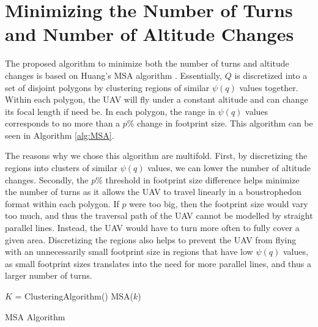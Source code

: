 \documentclass[conference]{IEEEtran}
\theoremstyle{plain}%
\begin{document}

\section{Minimizing the Number of Turns and Number of Altitude Changes}
The proposed algorithm to minimize both the number of turns and altitude changes is based on Huang's MSA algorithm \cite{huang2001optimal}. Essentially, $Q$ is discretized into a set of disjoint polygons by clustering regions of similar $\psi(q)$ values together. Within each polygon, the UAV will fly under a constant altitude and can change its focal length if need be. In each polygon, the range in $\psi(q)$ values corresponds to no more than a $p$\% change in footprint size. This algorithm can be seen in Algorithm \ref{alg:MSA}.

The reasons why we chose this algorithm are multifold. First, by discretizing the regions into clusters of similar $\psi(q)$ values, we can lower the number of altitude changes. Secondly, the $p$\% threshold in footprint size difference helps minimize the number of turns as it allows the UAV to travel linearly in a boustrophedon format within each polygon. If $p$ were too big, then the footprint size would vary too much, and thus the traversal path of the UAV cannot be modelled by straight parallel lines. Instead, the UAV would have to turn more often to fully cover a given area. Discretizing the regions also helps to prevent the UAV from flying with an unnecessarily small footprint size in regions that have low $\psi(q)$ values, as small footprint sizes translates into the need for more parallel lines, and thus a larger number of turns.

\begin{algorithm}
\begin{algorithmic}[1]
\STATE $K$ = ClusteringAlgorithm() 
\STATE MSA($k$) 
\ENDFOR
\end{algorithmic}
\caption{MSA Algorithm} 
\label{alg:MSA}
\end{algorithm}

\end{document}

